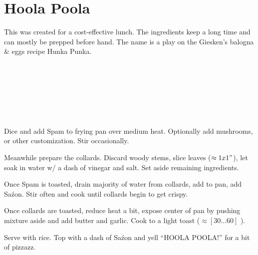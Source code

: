 \section{Hoola Poola}


\begin{recipestats}[
	servings=1 person,
	preptime=10 \minute,
	bakingtime=20 \minute,
	source=Teresi Family,
	]
\end{recipestats}


\begin{recipeabstract}
	This was created for a cost-effective lunch.
	The ingredients keep a long time and can mostly be prepped before hand.
	The name is a play on the Giesken's balogna \& eggs recipe Hunka Punka. %
\end{recipeabstract}


\begin{ingredientcolumns}
	\begin{ingredientblock}
		\\
		\\
		\\
	\end{ingredientblock}
	\begin{ingredientblock}
		\ingredient[\approx \onehalf][\teaspoon]{Sa\'zon}\\
		\ingredient[1][\Tablespoon]{butter}\\
		\ingredient[\onehalf][\Tablespoon]{garlic, minced}
	\end{ingredientblock}
\end{ingredientcolumns}


\begin{preparation}
\item Dice and add Spam to frying pan over medium heat.
	Optionally add mushrooms, or other customization.
	Stir occasionally.

\item Meanwhile prepare the collards.
	Discard woody stems, slice leaves ($\approx1x1"$), let soak in water w/ a dash of vinegar and salt.
	Set aside remaining ingredients.

\item Once Spam is toasted, drain majority of water from collards, add to pan, add Sa\'zon.
	Stir often and cook until collards begin to get crispy.

\item Once collards are toasted, reduce heat a bit, expose center of pan by pushing mixture aside and add butter and garlic.
	Cook to a light toast ($\approx[30\dots 60]$ \second).

\item Serve with rice.
	Top with a dash of Sa\'zon and yell ``HOOLA POOLA!'' for a bit of pizzazz.
\end{preparation}


\recipeend
